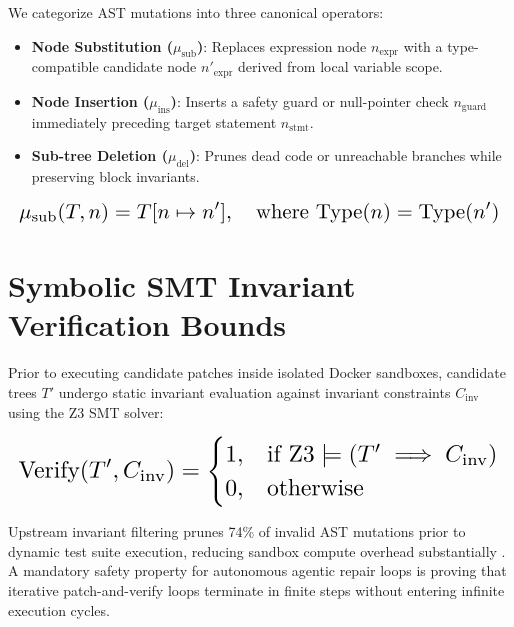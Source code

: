 \documentclass[11pt,a4paper]{article}
\begin{document}
We categorize AST mutations into three canonical operators:
\begin{itemize}
  \item \textbf{Node Substitution ($\mu_{\text{sub}}$)}: Replaces expression node $n_{\text{expr}}$ with a type-compatible candidate node $n'_{\text{expr}}$ derived from local variable scope.
  \item \textbf{Node Insertion ($\mu_{\text{ins}}$)}: Inserts a safety guard or null-pointer check $n_{\text{guard}}$ immediately preceding target statement $n_{\text{stmt}}$.
  \item \textbf{Sub-tree Deletion ($\mu_{\text{del}}$)}: Prunes dead code or unreachable branches while preserving block invariants.
\end{itemize}


\begin{equation}
\resizebox{\columnwidth}{!}{$\displaystyle
\begin{aligned}
\mu_{\text{sub}}(T, n) = T[n \mapsto n'], \quad \text{where } \text{Type}(n) = \text{Type}(n')
\end{aligned}
$}
\end{equation}




\section{Symbolic SMT Invariant Verification Bounds}


Prior to executing candidate patches inside isolated Docker sandboxes, candidate trees $T'$ undergo static invariant evaluation against invariant constraints $C_{\text{inv}}$ using the Z3 SMT solver:


\begin{equation}
\resizebox{\columnwidth}{!}{$\displaystyle
\begin{aligned}
\text{Verify}(T', C_{\text{inv}}) = \begin{cases} 1, & \text{if } \text{Z3} \models (T' \implies C_{\text{inv}}) \\ 0, & \text{otherwise} \end{cases}
\end{aligned}
$}
\end{equation}


Upstream invariant filtering prunes 74\% of invalid AST mutations prior to dynamic test suite execution, reducing sandbox compute overhead substantially \cite{wooldridge2009}. A mandatory safety property for autonomous agentic repair loops is proving that iterative patch-and-verify loops terminate in finite steps without entering infinite execution cycles.


\par\vspace{0.5em}


\end{document}
